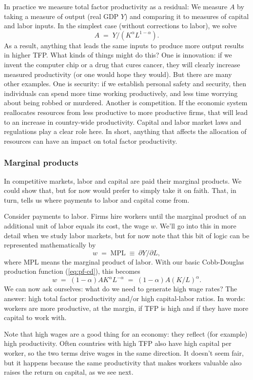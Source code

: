 \documentclass[letterpaper,12pt]{article}
\begin{document}
In practice we measure total factor productivity as a residual:
We measure $A$ by taking a measure of output (real GDP $Y$)
and comparing it to measures of capital and labor inputs.
In the simplest case (without corrections to labor), we solve
\[
    A \;=\; {Y}/{(K^\alpha L^{1-\alpha})}.
\]
As a result, anything that leads the same inputs to produce more
output results in higher TFP.
What kinds of things might do this?
One is innovation:  if we invent the computer chip or a drug
that cures cancer, they will clearly increase measured productivity
(or one would hope they would).
But there are many other examples.
One is security:  if we establish personal safety and security,
then individuals can spend more time working productively,
and less time worrying about being robbed or murdered.
Another is competition.  If the economic system
reallocates resources from less productive to more productive
firms, that will lead to an increase in country-wide productivity.
Capital and labor market laws and regulations play a clear role here.
In short, anything that affects the allocation of resources can
have an impact on total factor productivity.


\subsubsection*{Marginal products}

In competitive markets, labor and capital are paid their marginal products.
We could show that, but for now would prefer to simply take it on faith.
That, in turn, tells us where payments to labor and capital come from.

Consider payments to labor.
Firms hire workers until the marginal product of an additional unit of labor
equals its cost, the wage $w$.
We'll go into this in more detail when we study labor markets,
but for now note that this bit of logic can be represented mathematically by
\[
    w \;=\; \mbox{MPL} \;\equiv\; \partial Y/\partial L ,
\]
where MPL means the marginal product of labor.
With our basic Cobb-Douglas production function (\ref{eq:pf-cd}), this becomes
\[
    w \;=\; (1-\alpha) A K^\alpha L^{-\alpha} \;=\; (1-\alpha) A (K/L)^{\alpha}.
\]
We can now ask ourselves:  what do we need to generate high wage rates?
The answer:  high total factor productivity and/or high capital-labor ratios.
In words:  workers are more productive, at the margin, if TFP is high and
if they have more capital to work with.


Note that high wages are a good thing for an economy:
they reflect (for example) high productivity.
Often countries with high TFP also have high capital per worker, so the two
terms drive wages in the same direction.
It doesn't seem fair, but it happens because the same productivity that makes workers
valuable also raises the return on capital, as we see next.
\end{document}
